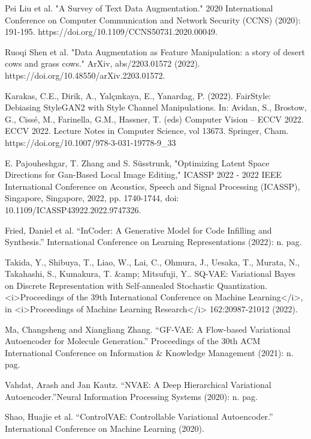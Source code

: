 \documentclass[preprint,12pt,authoryear]{elsarticle}
\begin{document}
\begin{thebibliography}{00}
Pei Liu et al. "A Survey of Text Data Augmentation." 2020 International Conference on Computer Communication and Network Security (CCNS) (2020): 191-195. https://doi.org/10.1109/CCNS50731.2020.00049.

Ruoqi Shen et al. "Data Augmentation as Feature Manipulation: a story of desert cows and grass cows." ArXiv, abs/2203.01572 (2022). https://doi.org/10.48550/arXiv.2203.01572.

Karakas, C.E., Dirik, A., Yalçınkaya, E., Yanardag, P. (2022). FairStyle: Debiasing StyleGAN2 with Style Channel Manipulations. In: Avidan, S., Brostow, G., Cissé, M., Farinella, G.M., Hassner, T. (eds) Computer Vision – ECCV 2022. ECCV 2022. Lecture Notes in Computer Science, vol 13673. Springer, Cham. https://doi.org/10.1007/978-3-031-19778-9\_33

E. Pajouheshgar, T. Zhang and S. Süsstrunk, "Optimizing Latent Space Directions for Gan-Based Local Image Editing," ICASSP 2022 - 2022 IEEE International Conference on Acoustics, Speech and Signal Processing (ICASSP), Singapore, Singapore, 2022, pp. 1740-1744, doi: 10.1109/ICASSP43922.2022.9747326.

Fried, Daniel et al. “InCoder: A Generative Model for Code Infilling and Synthesis.” International Conference on Learning Representations (2022): n. pag.

Takida, Y., Shibuya, T., Liao, W., Lai, C., Ohmura, J., Uesaka, T., Murata, N., Takahashi, S., Kumakura, T. \&amp; Mitsufuji, Y..  SQ-VAE: Variational Bayes on Discrete Representation with Self-annealed Stochastic Quantization. <i>Proceedings of the 39th International Conference on Machine Learning</i>, in <i>Proceedings of Machine Learning Research</i> 162:20987-21012 (2022).

Ma, Changsheng and Xiangliang Zhang. “GF-VAE: A Flow-based Variational Autoencoder for Molecule Generation.” Proceedings of the 30th ACM International Conference on Information \& Knowledge Management (2021): n. pag.

Vahdat, Arash and Jan Kautz. “NVAE: A Deep Hierarchical Variational Autoencoder.”Neural Information Processing Systems (2020): n. pag.

Shao, Huajie et al. “ControlVAE: Controllable Variational Autoencoder.” International Conference on Machine Learning (2020).


\end{thebibliography}
\end{document}
